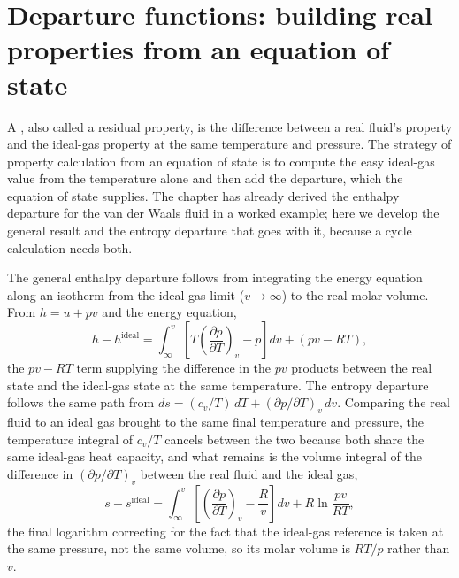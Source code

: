 \section{Departure functions: building real properties from an equation of
state}

A , also called a residual property, is the
difference between a real fluid's property and the ideal-gas property at the
same temperature and pressure. The strategy of property calculation from an
equation of state is to compute the easy ideal-gas value from the
temperature alone and then add the departure, which the equation of state
supplies. The chapter has already derived the enthalpy departure for the
van der Waals fluid in a worked example; here we develop the general result
and the entropy departure that goes with it, because a cycle calculation
needs both.

The general enthalpy departure follows from integrating the energy equation
along an isotherm from the ideal-gas limit ($v\to\infty$) to the real molar
volume. From $h = u + pv$ and the energy equation,
\[
h - h^{\text{ideal}} = \int_{\infty}^{v}\left[T\left(\frac{\partial
p}{\partial T}\right)_v - p\right]dv + (pv - RT),
\]
the $pv - RT$ term supplying the difference in the $pv$ products between the
real state and the ideal-gas state at the same temperature. The entropy
departure follows the same path from $ds = (c_v/T)\,dT + (\partial
p/\partial T)_v\,dv$. Comparing the real fluid to an ideal gas brought to
the same final temperature and pressure, the temperature integral of
$c_v/T$ cancels between the two because both share the same ideal-gas heat
capacity, and what remains is the volume integral of the difference in
$(\partial p/\partial T)_v$ between the real fluid and the ideal gas,
\[
s - s^{\text{ideal}} = \int_{\infty}^{v}\left[\left(\frac{\partial
p}{\partial T}\right)_v - \frac{R}{v}\right]dv + R\ln\frac{pv}{RT},
\]
the final logarithm correcting for the fact that the ideal-gas reference is
taken at the same pressure, not the same volume, so its molar volume is
$RT/p$ rather than $v$.

